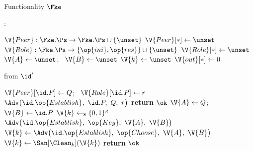 \begin{interface}[nofloat]{Functionality $\Fke$ \\
\params{$\PID$, \quad $\Ps$, \quad $\admits$, \quad
$\uses := \{(\Adv,\serves)\}$, \quad $\pars := \kappa$}}

{\scriptsize
\setlength{\columnsep}{1.4em}
\begin{multicols}{2}
:
\begin{algorithmic}[1]
\setcounter{contline}{0}\algcont
\State $\V{Peer} : \Fke.\Ps \to \Fke.\Ps \cup \{\unset\}$
\State $\V{Peer}[*] \gets \unset$
\State $\V{Role} : \Fke.\Ps \to \{\op{ini}, \op{res}\} \cup \{\unset\}$
\State $\V{Role}[*] \gets \unset$
\State $\V{A} \gets \unset$; \ $\V{B} \gets \unset$
\State $\V{k} \gets \unset$
\State $\V{out}[*] \gets 0$
\algsave
\end{algorithmic}
\vspace{1.4ex}

 \quad from $\id'$
\begin{algorithmic}[1]
\algcont
{} \label{ln:keonce}
\State $\V{Peer}[\id.P] \gets Q$; \ $\V{Role}[\id.P] \gets r$
\State $\Adv\bigl(\id.\op{Establish},\ \id.P,\ Q,\ r\bigr)$ \label{ln:ketuple}
  \State \textbf{return} $\ok$ \label{ln:kenopartner}
\EndIf
\State $\V{A} \gets Q$; \ $\V{B} \gets \id.P$ \label{ln:kematch}
  \State $\V{k} \gets_{\$} \{0,1\}^{\kappa}$ \label{ln:kedraw}
  \State $\Adv\bigl(\id.\op{Establish},\ \op{Key},\ \V{A},\ \V{B}\bigr)$ \label{ln:kewho}
\EndIf
{}
  \State $\V{k} \gets \Adv\bigl(\id.\op{Establish},\ \op{Choose},\ \V{A},\ \V{B}\bigr)$ \label{ln:kechoose}
  \State $\V{k} \gets \San[\Clean_{k}](\V{k})$
\EndIf
\State \textbf{return} $\ok$
\algsave
\end{algorithmic}
\vspace{1.4ex}


\end{multicols}}
\end{interface}
